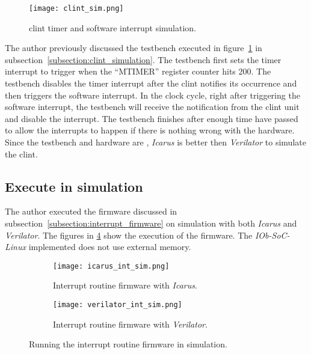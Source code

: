 \begin{figure}[!ht]
    \centering
    \texttt{[image: clint\_sim.png]}
    \caption{\acrshort{clint} timer and software interrupt simulation.}
    \label{fig:clint_sim}
\end{figure}

The author previously discussed the testbench executed in figure~\ref{fig:clint_sim} in subsection~\ref{subsection:clint_simulation}. The testbench first sets the timer interrupt to trigger when the \enquote{MTIMER} register counter hits 200. The testbench disables the timer interrupt after the \acrshort{clint} notifies its occurrence and then triggers the software interrupt. In the clock cycle, right after triggering the software interrupt, the testbench will receive the notification from the \acrshort{clint} unit and disable the interrupt. The testbench finishes after enough time have passed to allow the interrupts to happen if there is nothing wrong with the hardware. Since the testbench and hardware are , \textit{Icarus} is better then \textit{Verilator} to simulate the \acrshort{clint}.

\subsection{Execute in simulation}
The author executed the firmware discussed in subsection~\ref{subsection:interrupt_firmware} on simulation with both \textit{Icarus} and \textit{Verilator}. The figures in \ref{fig:int_sim} show the execution of the firmware. The \textit{IOb-SoC-Linux} implemented does not use external memory.

\begin{figure}[!ht]
    \centering
    \begin{subfigure}[b]{0.49\textwidth}
        \centering
        \texttt{[image: icarus\_int\_sim.png]}
        \caption{Interrupt routine firmware with \textit{Icarus}.}
        \label{fig:icarus_int_sim}
    \end{subfigure}
    \hfill
    \begin{subfigure}[b]{0.49\textwidth}
        \centering
        \texttt{[image: verilator\_int\_sim.png]}
        \caption{Interrupt routine firmware with \textit{Verilator}.}
        \label{fig:verilator_int_sim}
    \end{subfigure}
    \caption{Running the interrupt routine firmware in simulation.}
    \label{fig:int_sim}
\end{figure}

